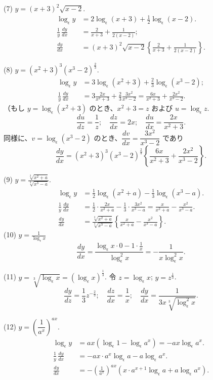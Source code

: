 \documentclass[a4paper,11pt,openany]{ltjsbook}
\begin{document}
(7) \( y = (x+3)^2 \sqrt{x-2} \).
\begin{align*}
\log_\epsilon y &= 2 \log_\epsilon(x+3) + \tfrac{1}{2} \log_\epsilon(x-2). \\
\frac{1}{y} \, \frac{dy}{dx} &= \frac{2}{x+3} + \frac{1}{2(x-2)}; \\
\frac{dy}{dx} &= (x+3)^2 \sqrt{x-2} \left\{\frac{2}{x+3} + \frac{1}{2(x-2)}\right\}.
\end{align*}

(8) \( y = (x^2+3)^3 (x^3-2)^{\frac{2}{3}} \).
\begin{align*}
\log_\epsilon y &= 3 \log_\epsilon(x^2+3) + \tfrac{2}{3} \log_\epsilon(x^3-2); \\
\frac{1}{y} \, \frac{dy}{dx} &= 3 \frac{2x}{x^2+3} + \frac{2}{3} \frac{3x^2}{x^3-2}
                            = \frac{6x}{x^2+3} + \frac{2x^2}{x^3-2}.
\end{align*}
（もし \( y = \log_\epsilon(x^2+3) \) のとき、\( x^2+3 = z \) および \( u = \log_\epsilon z \).
\[
\frac{du}{dz} = \frac{1}{z}; \quad
\frac{dz}{dx} = 2x; \quad
\frac{du}{dx} = \frac{2x}{x^2+3}.
\]
同様に、\( v = \log_\epsilon(x^3-2) \) のとき、\(\dfrac{dv}{dx} = \dfrac{3x^2}{x^3-2}\) であり
\[
\frac{dy}{dx}
= (x^2+3)^3 (x^3-2)^{\frac{2}{3}}
  \left\{ \frac{6x}{x^2+3} + \frac{2x^2}{x^3-2} \right\}.
\]

(9) \( y = \frac{\sqrt[2]{x^2 + a}}{\sqrt[3]{x^3 - a}} \).
\begin{align*}
\log_\epsilon y &= \frac{1}{2} \log_\epsilon (x^2 + a) - \frac{1}{3} \log_\epsilon (x^3 - a). \\
\frac{1}{y} \, \frac{dy}{dx} &= \frac{1}{2} \cdot \frac{2x}{x^2 + a} - \frac{1}{3} \cdot \frac{3x^2}{x^3 - a}
   = \frac{x}{x^2 + a} - \frac{x^2}{x^3 - a}. \\
\frac{dy}{dx} &= \frac{\sqrt[2]{x^2 + a}}{\sqrt[3]{x^3 - a}}
     \left\{ \frac{x}{x^2 + a} - \frac{x^2}{x^3 - a} \right\}.
\end{align*}
(10) \( y = \frac{1}{\log_\epsilon x} \)
\[
\frac{dy}{dx} = \frac{\log_\epsilon x \cdot 0 - 1 \cdot \frac{1}{x}} {\log_\epsilon^2 x}
   = -\frac{1}{x \log_\epsilon^2 x}.
\]

(11) \( y = \sqrt[3]{\log_\epsilon x} = (\log_\epsilon x)^{\frac{1}{3}} \). 令 \( z = \log_\epsilon x \); \( y = z^{\frac{1}{3}} \).
\[
\frac{dy}{dz} = \frac{1}{3} z^{-\frac{2}{3}}; \quad
\frac{dz}{dx} = \frac{1}{x}; \quad
\frac{dy}{dx} = \frac{1}{3x \sqrt[3]{\log_\epsilon^2 x}}.
\]

(12) \( y = \left(\dfrac{1}{a^x}\right)^{ax} \).
\begin{align*}
\log_\epsilon y &= ax (\log_\epsilon 1 - \log_\epsilon a^x) = -ax \log_\epsilon a^x. \\
\frac{1}{y} \, \frac{dy}{dx} &= -ax \cdot a^x \log_\epsilon a - a \log_\epsilon a^x.  \\
\frac{dy}{dx} &= -\left(\frac{1}{a^x}\right)^{ax}
      (x \cdot a^{x+1} \log_\epsilon a + a \log_\epsilon a^x).
\end{align*}
\end{document}
